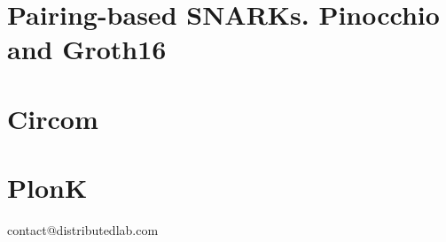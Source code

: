\documentclass{zkdl-template-105x135-nohead}
\begin{document}
    

    \section{Pairing-based SNARKs. Pinocchio and Groth16}

    

    \section{Circom}

    

    \section{PlonK}

    


    \newpage
    \pagestyle{empty}
    
    \ifodd\value{page}
        \newpage
    \fi
    
    \vspace*{\fill}
    
    \begin{center}
        contact@distributedlab.com
    \end{center}
    
    \vspace*{\fill}
\end{document}
